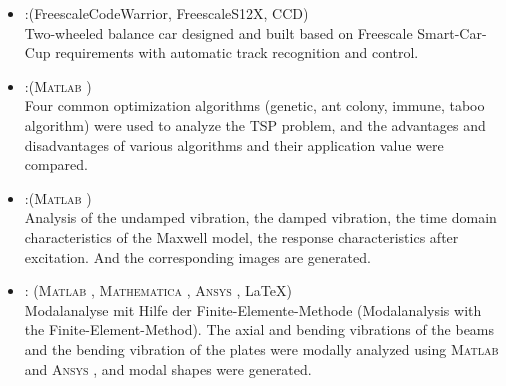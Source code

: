 \documentclass{resume}
\newcommand{\Matlab}{\textsc{Matlab}\textsuperscript{\textregistered} }
\newcommand{\Ansys}{\textsc{Ansys}\textsuperscript{\textregistered} }
\newcommand{\Mathematica}{\textsc{Mathematica}\textsuperscript{\textregistered} }
\begin{document}
\begin{itemize}
  \item {}:(Freescale\textregistered CodeWarrior, Freescale\textregistered S12X, CCD) \\
     Two-wheeled balance car designed and built based on Freescale Smart-Car-Cup requirements with automatic track recognition and control.
  \item {}:(\Matlab)\\
    Four common optimization algorithms (genetic, ant colony, immune, taboo algorithm) were used to analyze the TSP problem, and the advantages and disadvantages of various algorithms and their application value were compared.
  \item {}:(\Matlab)\\
    Analysis of the undamped vibration, the damped vibration, the time domain characteristics of the Maxwell model, the response characteristics after excitation. And the corresponding images are generated.
  \item {}: (\Matlab, \Mathematica, \Ansys, \LaTeX)\\
    Modalanalyse mit Hilfe der Finite-Elemente-Methode (Modalanalysis with the Finite-Element-Method). The axial and bending vibrations of the beams and the bending vibration of the plates were modally analyzed using \Matlab and \Ansys, and modal shapes were generated.

\end{itemize}
\end{document}
